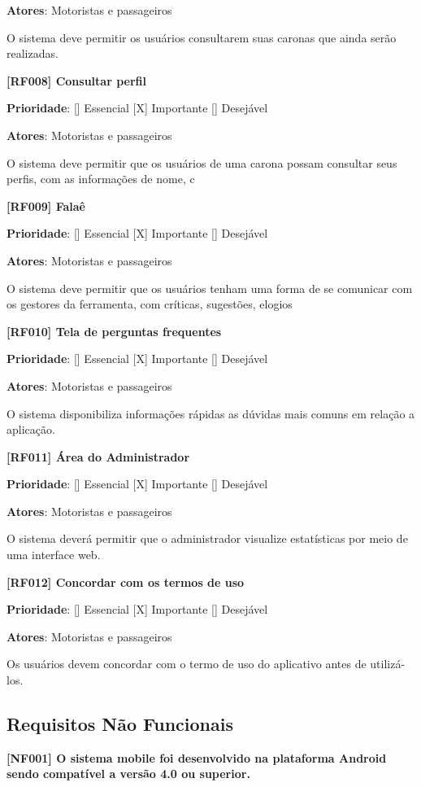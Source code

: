 \textbf{Atores}: Motoristas e passageiros

O sistema deve permitir os usuários consultarem suas caronas que ainda serão realizadas.


\textbf{[RF008] Consultar perfil}

\textbf{Prioridade}:      [] Essencial        [X] Importante     [] Desejável 

\textbf{Atores}: Motoristas e passageiros

O sistema deve permitir que os usuários de uma carona possam consultar seus perfis, com as informações de nome, c


\textbf{[RF009] Falaê}

\textbf{Prioridade}:      [] Essencial        [X] Importante     [] Desejável 

\textbf{Atores}: Motoristas e passageiros

O sistema deve permitir que os usuários tenham uma forma de se comunicar com os gestores da ferramenta, com críticas, sugestões, elogios

\textbf{[RF010]  Tela de perguntas frequentes}

\textbf{Prioridade}:      [] Essencial        [X] Importante     [] Desejável 

\textbf{Atores}: Motoristas e passageiros

O sistema disponibiliza informações rápidas as dúvidas mais comuns em relação a aplicação.

\textbf{[RF011] Área do Administrador}

\textbf{Prioridade}:      [] Essencial        [X] Importante     [] Desejável 

\textbf{Atores}: Motoristas e passageiros

O sistema deverá permitir que o administrador visualize
estatísticas por meio de uma interface web.

\textbf{[RF012] Concordar com os termos de uso} 

\textbf{Prioridade}:      [] Essencial        [X] Importante     [] Desejável 

\textbf{Atores}: Motoristas e passageiros

Os usuários devem concordar com o termo de uso do aplicativo antes de utilizá-los.


\subsection{Requisitos Não Funcionais}

\textbf{[NF001] O sistema mobile foi desenvolvido na plataforma Android sendo compatível a versão 4.0 ou superior. %
}

